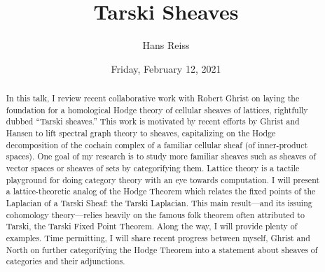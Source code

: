 \documentclass{UAmathtalk}
\author{Hans Reiss}
\title{Tarski Sheaves}
\date{Friday, February 12, 2021}
\begin{document}
\maketitle

\begin{abstract}
In this talk, I review recent collaborative work with Robert Ghrist on laying the foundation for a homological Hodge theory of cellular sheaves of lattices, rightfully dubbed ``Tarski sheaves.'' 
This work is motivated by recent efforts by Ghrist and Hansen to lift spectral graph theory to sheaves, capitalizing on the Hodge decomposition of the cochain complex of a familiar cellular sheaf (of inner-product spaces). 
One goal of my research is to study more familiar sheaves such as sheaves of vector spaces or sheaves of sets by categorifying them. 
Lattice theory is a tactile playground for doing category theory with an eye towards computation. 
I will present a lattice-theoretic analog of the Hodge Theorem which relates the fixed points of the Laplacian of a Tarski Sheaf: the Tarski Laplacian. 
This main result---and its issuing cohomology theory---relies heavily on the famous folk theorem often attributed to Tarski, the Tarski Fixed Point Theorem. 
Along the way, I will provide plenty of examples. 
Time permitting, I will share recent progress between myself, Ghrist and North on further categorifying the Hodge Theorem into a statement about sheaves of categories and their adjunctions.
\end{abstract}
\end{document}
